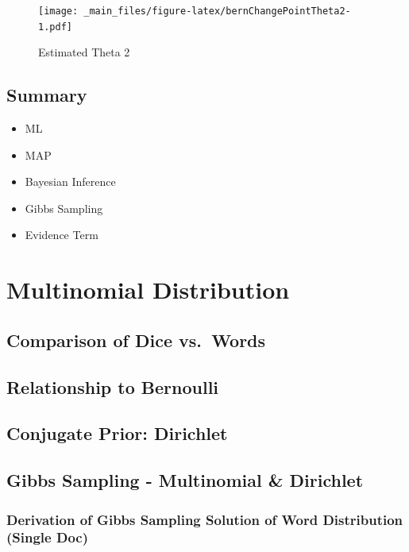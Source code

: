 \documentclass[]{book}
\providecommand{\tightlist}{%
  \setlength{\itemsep}{0pt}\setlength{\parskip}{0pt}}
\theoremstyle{definition}
\theoremstyle{definition}
\theoremstyle{definition}
\theoremstyle{remark}
\begin{document}
\begin{figure}
\centering
\texttt{[image: \_main\_files/figure-latex/bernChangePointTheta2-1.pdf]}
\caption{\label{fig:bernChangePointTheta2}Estimated Theta 2}
\end{figure}

\section{Summary}\label{summary}

\begin{itemize}
\tightlist
\item
  ML
\item
  MAP
\item
  Bayesian Inference
\item
  Gibbs Sampling
\item
  Evidence Term
\end{itemize}

\chapter{Multinomial Distribution}\label{multinomial-distribution}

\section{Comparison of Dice
vs.~Words}\label{comparison-of-dice-vs.words}

\section{Relationship to Bernoulli}\label{relationship-to-bernoulli}

\section{Conjugate Prior: Dirichlet}\label{conjugate-prior-dirichlet}

\section{Gibbs Sampling - Multinomial \&
Dirichlet}\label{gibbs-sampling---multinomial-dirichlet}

\subsection{Derivation of Gibbs Sampling Solution of Word Distribution
(Single
Doc)}\label{derivation-of-gibbs-sampling-solution-of-word-distribution-single-doc}
\end{document}
